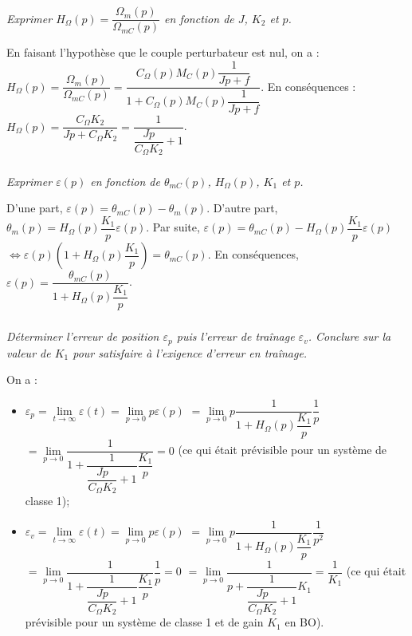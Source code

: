 \documentclass[10pt,fleqn]{article} %
\begin{document}
\begin{multicols}{2}
\else
\fi


\subparagraph{}\textit{Exprimer $H_{\Omega}(p)=\dfrac{\Omega_m(p)}{\Omega_{mC}(p)}$
en fonction de $J$, $K_2$ et $p$.}
\ifprof
\begin{corrige}
En faisant l'hypothèse que le couple perturbateur est nul, on a :
$H_{\Omega}(p)=\dfrac{\Omega_m(p)}{\Omega_{mC}(p)}=\dfrac{C_{\Omega}(p)M_C(p)\dfrac{1}{Jp+f}}{1+C_{\Omega}(p)M_C(p)\dfrac{1}{Jp+f}}$. En conséquences : 
$H_{\Omega}(p)=\dfrac{C_{\Omega} K_2}{Jp+C_{\Omega} K_2 } = \dfrac{1}{\dfrac{Jp}{C_{\Omega} K_2}+1 } $.

\end{corrige}
\else
\fi

\subparagraph{}\textit{Exprimer $\varepsilon(p)$ en fonction de $\theta_{mC}(p)$, $H_{\Omega}(p)$, $K_1$ et $p$.}
\ifprof

\begin{corrige}
D'une part, $\varepsilon(p)=\theta_{mC}(p)-\theta_{m}(p)$. D'autre part, 
$\theta_{m}(p) =H_{\Omega}(p) \dfrac{K_1}{p} \varepsilon(p)$. Par suite, 
$\varepsilon(p)=\theta_{mC}(p)-H_{\Omega}(p) \dfrac{K_1}{p}\varepsilon(p) $ 
$\Leftrightarrow \varepsilon(p)\left( 1+H_{\Omega}(p) \dfrac{K_1}{p}\right)= \theta_{mC}(p)$. 
En conséquences, $\varepsilon(p)=\dfrac{ \theta_{mC}(p)}{ 1+H_{\Omega}(p) \dfrac{K_1}{p}}$.
\end{corrige}
\else
\fi


\subparagraph{}\textit{Déterminer l’erreur de position $\varepsilon_p$ puis l’erreur de traînage $\varepsilon_v$. Conclure sur la valeur de $K_1$ pour satisfaire
à l’exigence d’erreur en traînage.}

\ifprof
\begin{corrige}
On a :
\begin{itemize}
\item $\varepsilon_p = \lim\limits_{t\to \infty} \varepsilon(t)= \lim\limits_{p\to 0} p\varepsilon(p) $ $= \lim\limits_{p\to 0} p \dfrac{ 1}{ 1+H_{\Omega}(p) \dfrac{K_1}{p}} \dfrac {1}{p}$
$= \lim\limits_{p\to 0} \dfrac{ 1}{ 1+\dfrac{1}{\dfrac{Jp}{C_{\Omega} K_2}+1 } \dfrac{K_1}{p}} = 0$ (ce qui était prévisible pour un système de classe 1);
\item $\varepsilon_v = \lim\limits_{t\to \infty} \varepsilon(t)= \lim\limits_{p\to 0} p\varepsilon(p) $ $= \lim\limits_{p\to 0} p \dfrac{ 1}{ 1+H_{\Omega}(p) \dfrac{K_1}{p}} \dfrac {1}{p^2}$
$= \lim\limits_{p\to 0} \dfrac{ 1}{ 1+\dfrac{1}{\dfrac{Jp}{C_{\Omega} K_2}+1 } \dfrac{K_1}{p}}\dfrac {1}{p} = 0$
$= \lim\limits_{p\to 0} \dfrac{ 1}{ p+\dfrac{1}{\dfrac{Jp}{C_{\Omega} K_2}+1 } K_1}= \dfrac{1}{K_1}$ (ce qui était prévisible pour un système de classe 1 et de gain $K_1$ en BO).
\end{itemize}


\end{corrige}
\end{multicols}
\end{document}
